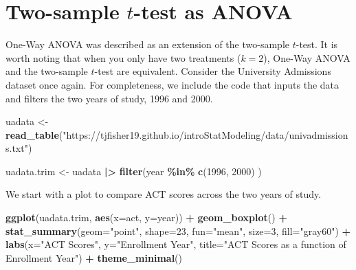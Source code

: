 \documentclass[
]{book}
\newenvironment{Shaded}{\begin{snugshade}}{\end{snugshade}}
\newcommand{\AttributeTok}[1]{\textcolor[rgb]{0.13,0.29,0.53}{#1}}
\newcommand{\DecValTok}[1]{\textcolor[rgb]{0.00,0.00,0.81}{#1}}
\newcommand{\FunctionTok}[1]{\textcolor[rgb]{0.13,0.29,0.53}{\textbf{#1}}}
\newcommand{\NormalTok}[1]{#1}
\newcommand{\OtherTok}[1]{\textcolor[rgb]{0.56,0.35,0.01}{#1}}
\newcommand{\SpecialCharTok}[1]{\textcolor[rgb]{0.81,0.36,0.00}{\textbf{#1}}}
\newcommand{\StringTok}[1]{\textcolor[rgb]{0.31,0.60,0.02}{#1}}
\begin{document}
\hypertarget{two-sample-t-test-as-anova}{%
\section{\texorpdfstring{Two-sample \(t\)-test as ANOVA}{Two-sample t-test as ANOVA}}\label{two-sample-t-test-as-anova}}

One-Way ANOVA was described as an extension of the two-sample \(t\)-test.
It is worth noting that when you only have two treatments (\(k=2\)), One-Way ANOVA and the two-sample \(t\)-test are equivalent.
Consider the University Admissions dataset once again.
For completeness, we include the code that inputs the data and filters the two years of study, 1996 and 2000.

\begin{Shaded}
\begin{Highlighting}[]
\NormalTok{uadata }\OtherTok{\textless{}{-}} \FunctionTok{read\_table}\NormalTok{(}\StringTok{"https://tjfisher19.github.io/introStatModeling/data/univadmissions.txt"}\NormalTok{)}

\NormalTok{uadata.trim }\OtherTok{\textless{}{-}}\NormalTok{ uadata }\SpecialCharTok{|\textgreater{}}
  \FunctionTok{filter}\NormalTok{(year }\SpecialCharTok{\%in\%} \FunctionTok{c}\NormalTok{(}\DecValTok{1996}\NormalTok{, }\DecValTok{2000}\NormalTok{) )}
\end{Highlighting}
\end{Shaded}

We start with a plot to compare ACT scores across the two years of study.

\begin{Shaded}
\begin{Highlighting}[]
\FunctionTok{ggplot}\NormalTok{(uadata.trim, }\FunctionTok{aes}\NormalTok{(}\AttributeTok{x=}\NormalTok{act, }\AttributeTok{y=}\NormalTok{year)) }\SpecialCharTok{+} 
  \FunctionTok{geom\_boxplot}\NormalTok{() }\SpecialCharTok{+}
  \FunctionTok{stat\_summary}\NormalTok{(}\AttributeTok{geom=}\StringTok{"point"}\NormalTok{, }\AttributeTok{shape=}\DecValTok{23}\NormalTok{, }\AttributeTok{fun=}\StringTok{"mean"}\NormalTok{, }\AttributeTok{size=}\DecValTok{3}\NormalTok{, }\AttributeTok{fill=}\StringTok{"gray60"}\NormalTok{) }\SpecialCharTok{+}
  \FunctionTok{labs}\NormalTok{(}\AttributeTok{x=}\StringTok{"ACT Scores"}\NormalTok{, }\AttributeTok{y=}\StringTok{"Enrollment Year"}\NormalTok{,}
       \AttributeTok{title=}\StringTok{"ACT Scores as a function of Enrollment  Year"}\NormalTok{) }\SpecialCharTok{+}
  \FunctionTok{theme\_minimal}\NormalTok{()}
\end{Highlighting}
\end{Shaded}
\end{document}
